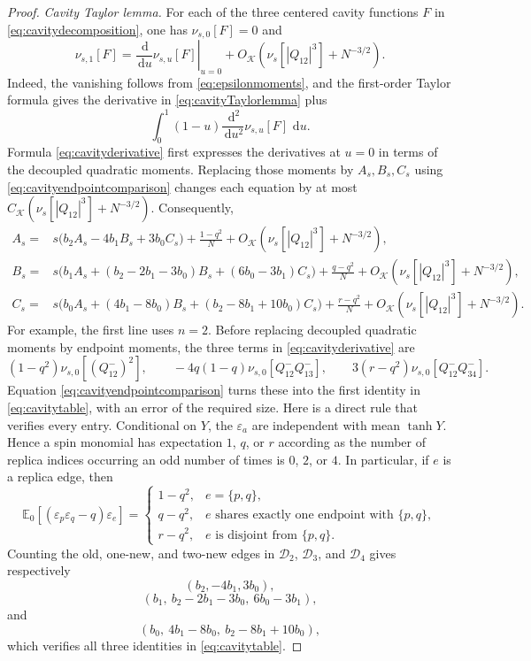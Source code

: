 \documentclass[11pt]{article}
\numberwithin{equation}{section}
\newcommand{\E}{\mathbb{E}}
\newcommand{\1}{\mathbf 1}
\newcommand{\cK}{\mathcal K}
\newcommand{\dd}{\,\mathrm d}
\begin{document}
\begin{proof}
\medskip
\noindent\emph{Cavity Taylor lemma.}
For each of the three centered cavity functions $F$ in
\eqref{eq:cavitydecomposition}, one has $\nu_{s,0}[F]=0$ and
\begin{equation}
 \nu_{s,1}[F]=
 \left.\frac{\dd}{\dd u}\nu_{s,u}[F]\right|_{u=0}
 +O_{\cK}\left(\nu_s[|Q_{12}|^3]+N^{-3/2}\right).
 \label{eq:cavityTaylorlemma}
\end{equation}
Indeed, the vanishing follows from \eqref{eq:epsilonmoments}, and the
first-order Taylor formula gives the derivative in
\eqref{eq:cavityTaylorlemma} plus
\[
 \int_0^1(1-u)\frac{\dd^2}{\dd u^2}\nu_{s,u}[F]\,\dd u.
\]
Formula \eqref{eq:cavityderivative} first
expresses the derivatives at $u=0$ in terms of the decoupled quadratic
moments.  Replacing those moments by $A_s,B_s,C_s$ using
\eqref{eq:cavityendpointcomparison} changes each equation by at most
$C_{\cK}(\nu_s[|Q_{12}|^3]+N^{-3/2})$.  Consequently,
\begin{align}
 A_s={}&s\bigl(b_2A_s-4b_1B_s+3b_0C_s\bigr)
       +\frac{1-q^2}{N}
       +O_{\cK}\left(\nu_s[|Q_{12}|^3]+N^{-3/2}\right),\nonumber\\
 B_s={}&s\bigl(b_1A_s+(b_2-2b_1-3b_0)B_s
                    +(6b_0-3b_1)C_s\bigr)
       +\frac{q-q^2}{N}
       +O_{\cK}\left(\nu_s[|Q_{12}|^3]+N^{-3/2}\right),\nonumber\\
 C_s={}&s\bigl(b_0A_s+(4b_1-8b_0)B_s
                    +(b_2-8b_1+10b_0)C_s\bigr)
       +\frac{r-q^2}{N}
       +O_{\cK}\left(\nu_s[|Q_{12}|^3]+N^{-3/2}\right).
 \label{eq:cavitytable}
\end{align}
For example, the first line uses $n=2$.  Before replacing decoupled
quadratic moments by endpoint moments, the three terms in
\eqref{eq:cavityderivative} are
\[
 (1-q^2)\nu_{s,0}[(Q^-_{12})^2],\qquad
 -4q(1-q)\nu_{s,0}[Q^-_{12}Q^-_{13}],\qquad
 3(r-q^2)\nu_{s,0}[Q^-_{12}Q^-_{34}].
\]
Equation \eqref{eq:cavityendpointcomparison} turns these into the first
identity in \eqref{eq:cavitytable}, with an error of the required size.
Here is a direct rule that verifies every entry.  Conditional on $Y$,
the $\varepsilon_a$ are independent with mean $\tanh Y$.  Hence a
spin monomial has expectation $1$, $q$, or $r$ according as the
number of replica indices occurring an odd number of times is
$0$, $2$, or $4$.  In particular, if $e$ is a replica edge, then
\[
 \E_0[(\varepsilon_p\varepsilon_q-q)\varepsilon_e]
 =
 \begin{cases}
  1-q^2,&e=\{p,q\},\\
  q-q^2,&e\text{ shares exactly one endpoint with }\{p,q\},\\
  r-q^2,&e\text{ is disjoint from }\{p,q\}.
 \end{cases}
\]
Counting the old, one-new, and two-new edges in $\mathcal D_2$,
$\mathcal D_3$, and $\mathcal D_4$ gives respectively
\[
 (b_2,-4b_1,3b_0),
\]
\[
 (b_1,\ b_2-2b_1-3b_0,\ 6b_0-3b_1),
\]
and
\[
 (b_0,\ 4b_1-8b_0,\ b_2-8b_1+10b_0),
\]
which verifies all three identities in \eqref{eq:cavitytable}.


\end{proof}
\end{document}
